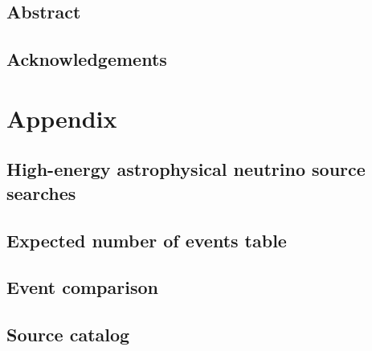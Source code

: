 \documentclass[oneside, letterpaper, 10pt, oldfontcommands]{memoir}
\begin{document}
\frontmatter

\thetitlepage
\cleardoublepage
\setcounter{page}{1}

\section{Abstract}
\uwabstract
\cleardoublepage

\section{Acknowledgements}


\clearpage

\tableofcontents\clearpage
\listoffigures\clearpage
\listoftables\clearpage

\mainmatter













\clearpage
\newpage
\appendix

\chapter{Appendix}
\begingroup
\graphicspath{{results/HESE_Final_Paper/}}
\section{High-energy astrophysical neutrino source searches\label{sec:sources}}

\section{Expected number of events table\label{sec:events_table}}

\section{Event comparison\label{sec:comparison}}

\section{Source catalog\label{sec:source_catalog}}

\end{document}
